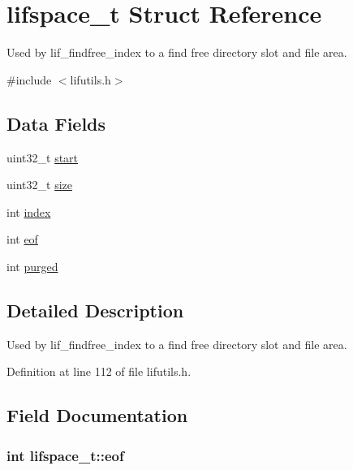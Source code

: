 \hypertarget{structlifspace__t}{}\section{lifspace\+\_\+t Struct Reference}
\label{structlifspace__t}


Used by lif\+\_\+findfree\+\_\+index to a find free directory slot and file area.  




{\ttfamily \#include $<$lifutils.\+h$>$}

\subsection*{Data Fields}
\begin{DoxyCompactItemize}
\item 
uint32\+\_\+t \hyperlink{structlifspace__t_a35702daf31460f978a09aef7a42c2671}{start}
\item 
uint32\+\_\+t \hyperlink{structlifspace__t_a0519f0089ed8694cbb2208364c6b31bd}{size}
\item 
int \hyperlink{structlifspace__t_abcca3daca009eca56173dc8577d597da}{index}
\item 
int \hyperlink{structlifspace__t_ad676dc78af3d2cd07c729affab6ec27e}{eof}
\item 
int \hyperlink{structlifspace__t_a53fce276ffb7bb4f8556cc2e7ac76390}{purged}
\end{DoxyCompactItemize}


\subsection{Detailed Description}
Used by lif\+\_\+findfree\+\_\+index to a find free directory slot and file area. 

Definition at line 112 of file lifutils.\+h.



\subsection{Field Documentation}
\subsubsection[{\texorpdfstring{eof}{eof}}]{\setlength{\rightskip}{0pt plus 5cm}int lifspace\+\_\+t\+::eof}\hypertarget{structlifspace__t_ad676dc78af3d2cd07c729affab6ec27e}{}\label{structlifspace__t_ad676dc78af3d2cd07c729affab6ec27e}


